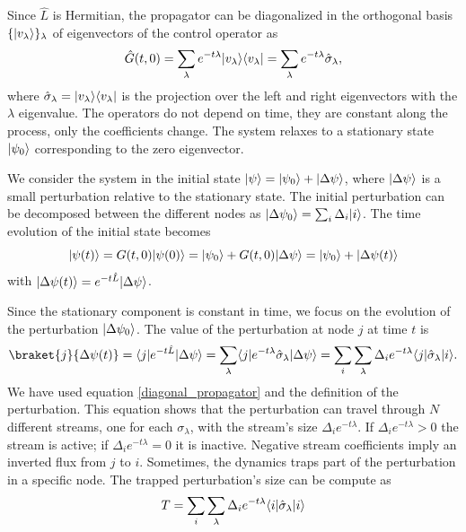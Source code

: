 Since $\hat L$ is Hermitian, the propagator can be diagonalized in the orthogonal basis $\{\lvert v_\lambda\rangle\}_\lambda$ of eigenvectors of the control operator as
\begin{equation}\label{diagonal_propagator}
    \hat G(t,0) = \sum_\lambda e^{-t\lambda} \lvert v_\lambda\rangle\langle v_\lambda\rvert = \sum_\lambda e^{-t\lambda} \hat \sigma_\lambda,
\end{equation}
where $\hat \sigma_\lambda = \lvert v_\lambda\rangle\langle v_\lambda\rvert$ is the projection over the left and right eigenvectors with the $\lambda$ eigenvalue. The operators do not depend on time, they are constant along the process, only the coefficients change.
The system relaxes to a stationary state $\lvert\psi_0\rangle$ corresponding to the zero eigenvector.

We consider the system in the initial state $\lvert\psi\rangle = \lvert\psi_0\rangle + \lvert\Delta\psi\rangle$, where $\lvert\Delta\psi\rangle$ is a small perturbation relative to the stationary state. The initial perturbation can be decomposed between the different nodes as $\lvert\Delta\psi_0\rangle = \sum_i \Delta_i \lvert i\rangle$.
The time evolution of the initial state becomes
\begin{equation}
    \lvert\psi(t)\rangle = G(t,0) \lvert\psi(0)\rangle = \lvert\psi_0\rangle + G(t,0)\lvert\Delta\psi\rangle = \lvert\psi_0\rangle + \lvert\Delta\psi(t)\rangle
\end{equation}
with $\lvert\Delta\psi(t)\rangle = e^{-t\hat L} \lvert\Delta \psi\rangle$.

Since the stationary component is constant in time, we focus on the evolution of the perturbation $\lvert\Delta\psi_0\rangle$. 
The value of the perturbation at node $j$ at time $t$ is
\begin{equation}
    \braket{j}{\Delta\psi(t)} = \bra{j} e^{-t\hat L} \ket{\Delta\psi} =\sum_\lambda \bra{j} e^{-t\lambda} \hat \sigma_\lambda\ket{\Delta\psi} = \sum_i  \sum_\lambda \Delta_i e^{-t\lambda} \bra{j}  \hat \sigma_\lambda \ket{i}.
\end{equation}
We have used equation \eqref{diagonal_propagator} and the definition of the perturbation.
This equation shows that the perturbation can travel through $N$ different streams, one for each $\sigma_\lambda$, with the stream's size $\Delta_i e^{-t\lambda}$. If $\Delta_i e^{-t\lambda} > 0$ the stream is active; if $\Delta_i e^{-t\lambda} = 0$ it is inactive. Negative stream coefficients imply an inverted flux from $j$ to $i$.
Sometimes, the dynamics traps part of the perturbation in a specific node. The trapped perturbation's size can be compute as
\begin{equation}\label{T_equation}
    T = \sum_i  \sum_\lambda \Delta_i e^{-t\lambda} \langle i\rvert  \hat \sigma_\lambda \lvert i\rangle 
\end{equation} 

